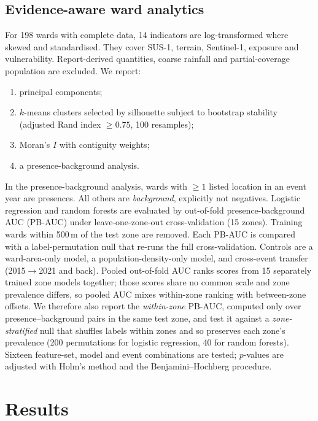 \documentclass[conference]{IEEEtran}
\begin{document}
\subsection{Evidence-aware ward analytics}
For 198 wards with complete data, 14 indicators are log-transformed where skewed and standardised. They cover SUS-1, terrain, Sentinel-1, exposure and vulnerability. Report-derived quantities, coarse rainfall and partial-coverage population are excluded. We report:
\begin{enumerate}
\item principal components;
\item $k$-means clusters selected by silhouette \cite{rousseeuw1987silhouette} subject to bootstrap stability (adjusted Rand index \cite{hubert1985ari} $\ge 0.75$, 100 resamples);
\item Moran's $I$ \cite{moran1950} with contiguity weights;
\item a presence-background analysis.
\end{enumerate}
In the presence-background analysis, wards with $\geq 1$ listed location in an event year are presences. All others are \emph{background}, explicitly not negatives. Logistic regression and random forests \cite{breiman2001rf,pedregosa2011sklearn} are evaluated by out-of-fold presence-background AUC (PB-AUC) under leave-one-zone-out cross-validation (15 zones). Training wards within 500\,m of the test zone are removed. Each PB-AUC is compared with a label-permutation null that re-runs the full cross-validation. Controls are a ward-area-only model, a population-density-only model, and cross-event transfer (2015$\to$2021 and back). Pooled out-of-fold AUC ranks scores from 15 separately trained zone models together; those scores share no common scale and zone prevalence differs, so pooled AUC mixes within-zone ranking with between-zone offsets. We therefore also report the \emph{within-zone} PB-AUC, computed only over presence--background pairs in the same test zone, and test it against a \emph{zone-stratified} null that shuffles labels within zones and so preserves each zone's prevalence (200 permutations for logistic regression, 40 for random forests). Sixteen feature-set, model and event combinations are tested; $p$-values are adjusted with Holm's method and the Benjamini--Hochberg procedure.

\section{Results}
\end{document}
